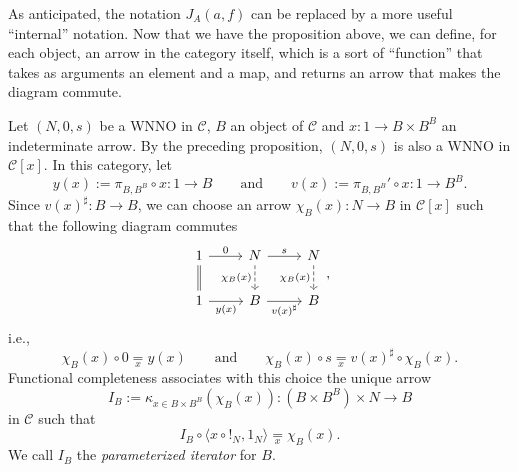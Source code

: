As anticipated, the notation $J_A(a,f)$ can be replaced by a more useful “internal” notation.
Now that we have the proposition above, we can define, for each object, an arrow in the category itself, which is a sort of “function” that takes as arguments an element and a map, and returns an arrow that makes the diagram commute.

\begin{definition}
    Let $(N,0,s)$ be a WNNO in $\mathcal{C}$, $B$ an object of $\mathcal{C}$ and $x : 1 \to B \times B^B$ an indeterminate arrow.
    By the preceding proposition, $(N,0,s)$ is also a WNNO in $\mathcal{C}[x]$. In this category, let
    \[ y(x) := \pi_{B,B^B} \circ x : 1 \to B \qquad\text{and}\qquad v(x) := \pi_{B,B^B}' \circ x : 1 \to B^B. \]
    Since $v(x)^\sharp : B \to B$, we can choose an arrow $\chi_B(x) : N \to B$ in $\mathcal{C}[x]$ such that the following diagram commutes
    \[\begin{tikzcd}
        1 & N & N \\
        1 & B & B
        \arrow["0", from=1-1, to=1-2]
        \arrow[shift right = 0.20ex, no head, from=1-1, to=2-1]
        \arrow[shift left = 0.20ex, no head, from=1-1, to=2-1]
        \arrow["s", from=1-2, to=1-3]
        \arrow["{\chi_B(x)}"', dashed, from=1-2, to=2-2]
        \arrow["{\chi_B(x)}"', dashed, from=1-3, to=2-3]
        \arrow["{y(x)}"', from=2-1, to=2-2]
        \arrow["{v(x)^\sharp}"', from=2-2, to=2-3]
    \end{tikzcd},\]
    i.e.,
    \[ \chi_B(x) \circ 0 \underset{x}{=} y(x) \qquad\text{and}\qquad
    \chi_B(x) \circ s \underset{x}{=} v(x)^\sharp \circ \chi_B(x). \]
    Functional completeness associates with this choice the unique arrow
    \[ I_B := \kappa_{x \in B \times B^B}(\chi_B(x)) : (B \times B^B) \times N \to B \]\label{idx:parameterized-iterator}
    in $\mathcal{C}$ such that
    \[ I_B \circ \langle x \circ !_N,1_N\rangle \underset{x}{=} \chi_B(x). \]
    We call $I_B$ the \emph{parameterized iterator} for $B$.
\end{definition}


